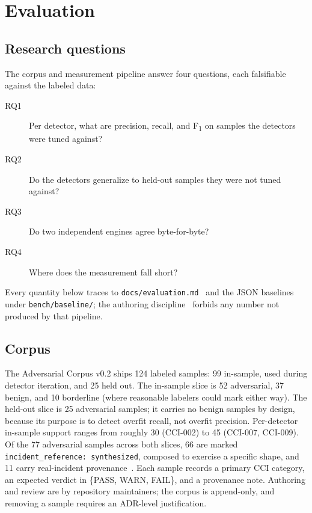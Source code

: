 
\section{Evaluation}
\label{sec:evaluation}

\subsection{Research questions}

The corpus and measurement pipeline answer four questions, each
falsifiable against the labeled data:
\begin{description}
  \item[RQ1] Per detector, what are precision, recall, and
    F\textsubscript{1} on samples the detectors were tuned against?
  \item[RQ2] Do the detectors generalize to held-out samples they were
    not tuned against?
  \item[RQ3] Do two independent engines agree byte-for-byte?
  \item[RQ4] Where does the measurement fall short?
\end{description}
Every quantity below traces to
\texttt{docs/evaluation.md}~\cite{primitivehub:2026:eval} and the JSON
baselines under \texttt{bench/baseline/}; the authoring
discipline~\cite{primitivehub:2026:paper-readme} forbids any number not
produced by that pipeline.

\subsection{Corpus}

The Adversarial Corpus v0.2 ships 124 labeled samples: 99 in-sample,
used during detector iteration, and 25 held out. The in-sample slice is
52 adversarial, 37 benign, and 10 borderline (where reasonable labelers
could mark either way). The held-out slice is 25 adversarial samples;
it carries no benign samples by design, because its purpose is to detect
overfit recall, not overfit precision. Per-detector in-sample support
ranges from roughly 30 (CCI-002) to 45 (CCI-007, CCI-009). Of the 77
adversarial samples across both slices, 66 are marked
\texttt{incident\_reference: synthesized}, composed to exercise a
specific shape, and 11 carry real-incident
provenance~\cite{primitivehub:2026:corpus-spec}. Each sample records a
primary CCI category, an expected verdict in \{PASS, WARN, FAIL\}, and a
provenance note. Authoring and review are by repository maintainers; the
corpus is append-only, and removing a sample requires an ADR-level
justification.

